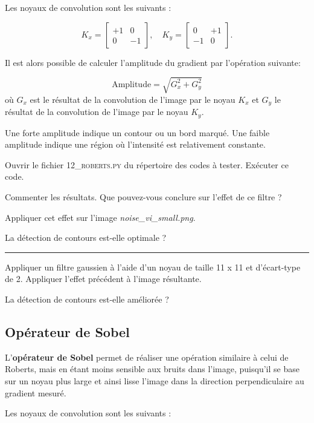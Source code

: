 Les noyaux de convolution sont les suivants :

$$K_x = \begin{bmatrix}
+1 & 0 \\
0 & -1
\end{bmatrix},
\quad
K_y =
\begin{bmatrix}
0 & +1 \\
-1 & 0
\end{bmatrix}.
$$

Il est alors possible de calculer l'amplitude du gradient par l'opération suivante: 

$$\text{Amplitude} = \sqrt{G_x^2 + G_y^2}$$ où $G_x$ est le résultat de la convolution de l'image par le noyau $K_x$ et $G_y$ le résultat de la convolution de l'image par le noyau $K_y$.

Une forte amplitude indique un contour ou un bord marqué. Une faible amplitude indique une région où l'intensité est relativement constante.

\medskip

\Manip Ouvrir le fichier \textsc{12\_roberts.py} du répertoire des codes à tester. Exécuter ce code.

\Quest Commenter les résultats. Que pouvez-vous conclure sur l'effet de ce filtre ?

\Manip Appliquer cet effet sur l'image \textsl{noise\_vi\_small.png}.

\Quest La détection de contours est-elle optimale ?

\noindent \rule{\linewidth}{1pt}

\Manip Appliquer un filtre gaussien à l'aide d'un noyau de taille 11 x 11 et d'écart-type de 2. Appliquer l'effet précédent à l'image résultante.

\Quest La détection de contours est-elle améliorée ?

\bigskip

\bigskip

\subsection{Opérateur de Sobel}

L'\textbf{opérateur de Sobel} permet de réaliser une opération similaire à celui de Roberts, mais en étant moins sensible aux bruits dans l'image, puisqu'il se base sur un noyau plus large et ainsi lisse l'image dans la direction perpendiculaire au gradient mesuré.

Les noyaux de convolution sont les suivants :

